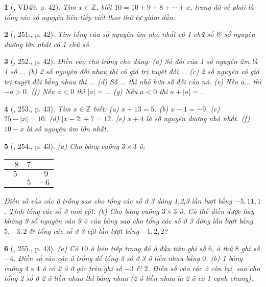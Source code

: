 \documentclass{article}
\newtheorem{baitoan}{}
\begin{document}
\begin{baitoan}[\cite{Binh_Toan_6_tap_1}, VD49, p. 42]
	Tìm $x\in\mathbb{Z}$, biết $10 = 10 + 9 + 8 + \cdots + x$, trong đó vế phải là tổng các số nguyên liên tiếp viết theo thứ tự giảm dần.
\end{baitoan}

\begin{baitoan}[\cite{Binh_Toan_6_tap_1}, 251., p. 42]
	Tìm tổng của số nguyên âm nhỏ nhất có 1 chữ số \& số nguyên dương lớn nhất có 1 chữ số.
\end{baitoan}

\begin{baitoan}[\cite{Binh_Toan_6_tap_1}, 252., p. 42]
	Điền vào chỗ trống cho đúng: (a) Số đối của 1 số nguyên âm là 1 số $\ldots$ (b) 2 số nguyên đối nhau thì có giá trị tuyệt đối $\ldots$ (c) 2 số nguyên có giá trị tuyệt đối bằng nhau thì $\ldots$ (d) Số $\ldots$ thì nhỏ hơn số đối của nó. (e) Nếu $a\ldots$ thì $-a > 0$. (f) Nếu $a < 0$ thì $|a| = \ldots$ (g) Nếu $a < 0$ thì $a + |a| = \ldots$
\end{baitoan}

\begin{baitoan}[\cite{Binh_Toan_6_tap_1}, 253., p. 43]
	Tìm $x\in\mathbb{Z}$ biết: (a) $x + 13 = 5$. (b) $x - 1 = -9$. (c) $25 - |x| = 10$. (d) $|x - 2| + 7 = 12$. (e) $x + 4$ là số nguyên dương nhỏ nhất. (f) $10 - x$ là số nguyên âm lớn nhất.
\end{baitoan}

\begin{baitoan}[\cite{Binh_Toan_6_tap_1}, 254., p. 43]
	(a) Cho bảng vuông $3\times 3$ ô:
	\begin{table}[H]
		\centering
		\begin{tabular}{|c|c|c|}
			\hline
			$-8$ & $7$ &  \\
			\hline
			$\ \ 5$ &  & $\ \ 9$ \\
			\hline
			& $5$ & $-6$ \\
			\hline
		\end{tabular}
	\end{table}
	\noindent Điền số vào các ô trống sao cho tổng các số ở 3 dòng 1,2,3 lần lượt bằng $-5,11,1$. Tính tổng các số ở mỗi cột. (b) Cho bảng vuông $3\times 3$ ô. Có thể điền được hay không 9 số nguyên vào 9 ô của bảng sao cho tổng các số ở 3 dòng lần lượt bằng $5,-3,2$ \& tổng các số ở 3 cột lần lượt bằng $-1,2,2$?
\end{baitoan}

\begin{baitoan}[\cite{Binh_Toan_6_tap_1}, 255., p. 43]
	(a) Có $10$ ô liên tiếp trong đó ô đầu tiên ghi số $6$, ô thứ $8$ ghi số $-4$. Điền số vào các ô trống để tổng 3 số ở 3 ô liền nhau bằng $0$. (b) 1 bảng vuông $4\times 4$ ô có 2 ô ở góc trên ghi số $-3$ \& $2$. Điền số vào các ô còn lại, sao cho tổng 2 số ở 2 ô liền nhau thì bằng nhau (2 ô liền nhau là 2 ô có 1 cạnh chung).	
\end{baitoan}
\end{document}
